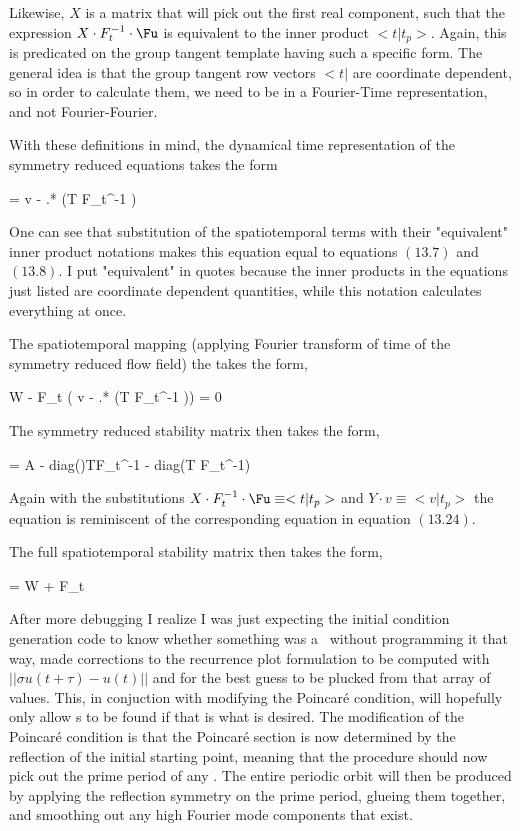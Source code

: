 Likewise, $X$ is a matrix that will pick out the first real component, such that
the expression $X \cdot F^{-1}_t \cdot \Fu$ is equivalent to the inner product
$<t | t_p>$. Again, this is predicated on the group tangent template having such
a specific form. The general idea is that the group tangent row vectors $<t|$
are coordinate dependent, so in order to calculate them, we need to be in a
Fourier-Time representation, and not Fourier-Fourier.

With these definitions in mind, the dynamical time representation of the symmetry reduced
equations takes the form

\beq \label{MNGsymred_dyn_t}
 = v -  .* (T \cdot F_t^{-1} \cdot \Fu)
\eeq

One can see that substitution of the spatiotemporal
terms with their "equivalent" inner product notations makes this equation equal to
 equations $(13.7)$ and $(13.8)$. I put "equivalent" in quotes
because the inner products in the equations just listed are coordinate dependent
quantities, while this notation calculates everything at once.

The spatiotemporal mapping (applying Fourier transform of time of the symmetry reduced flow field)
the takes the form,

\beq
W \cdot \Fu - F_t \cdot( v -  .* (T \cdot F_t^{-1} \cdot \Fu)) = 0
\eeq

The symmetry reduced stability matrix then takes the form,

\beq
{} = A - diag()\cdot T\cdot F_t^{-1}
- diag(T \cdot F_t^{-1}\cdot \Fu) \cdot {}
\eeq

Again with the substitutions $X \cdot F^{-1}_t \cdot \Fu \equiv <t | t_p>$ and $Y \cdot v \equiv < v | t_p >$ the
equation is reminiscent of the corresponding equation in   equation $(13.24)$.

The full spatiotemporal stability matrix then takes the form,

\beq
{} = W + F_t \cdot {}
\eeq

After more debugging I realize I was just expecting the initial condition generation
code to know whether something was a \ppo\ without programming it that way,
made corrections to the recurrence plot formulation to be computed with
$||\sigma u(t + \tau) - u(t)||$ and for the best guess to be plucked from that array of
values. This, in conjuction with modifying the Poincar\'e condition, will hopefully
only allow {\ppo}s to be found if that is what is desired. The modification of the
Poincar\'e condition is that the Poincar\'e section is now determined by the reflection
of the initial starting point, meaning that the procedure should now pick out the prime
period of any \ppo. The entire periodic orbit will then be produced by applying the
reflection symmetry on the prime period, glueing them together, and smoothing out
any high Fourier mode components that exist.

